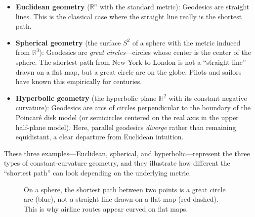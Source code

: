 \begin{itemize}
    \item \textbf{Euclidean geometry} ($\mathbb{R}^n$ with the standard metric): Geodesics are straight lines. This is the classical case where the straight line really is the shortest path.

    \item \textbf{Spherical geometry} (the surface $S^2$ of a sphere with the metric induced from $\mathbb{R}^3$): Geodesics are \emph{great circles}---circles whose center is the center of the sphere. The shortest path from New York to London is not a ``straight line'' drawn on a flat map, but a great circle arc on the globe. Pilots and sailors have known this empirically for centuries.

    \item \textbf{Hyperbolic geometry} (the hyperbolic plane $\mathbb{H}^2$ with its constant negative curvature): Geodesics are arcs of circles perpendicular to the boundary of the Poincar\'e disk model (or semicircles centered on the real axis in the upper half-plane model). Here, parallel geodesics \emph{diverge} rather than remaining equidistant, a clear departure from Euclidean intuition.
\end{itemize}
These three examples---Euclidean, spherical, and hyperbolic---represent the three types of constant-curvature geometry, and they illustrate how different the ``shortest path'' can look depending on the underlying metric.

\begin{figure}[htbp]
\centering
{}
\caption{On a sphere, the shortest path between two points is a great circle arc (blue), not a straight line drawn on a flat map (red dashed). This is why airline routes appear curved on flat maps.}
\label{fig:geodesic-sphere}
\end{figure}

